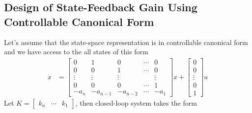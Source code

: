 \documentclass[twoside]{article}
\begin{document}
\subsection{Design of State-Feedback Gain Using Controllable Canonical
Form}

Let's assume that the state-space representation is in controllable
canonical form and we have access to the all states of this form
%
\begin{align*}
\dot{x} &= \left[ \begin{array}{ccccc} 0 & 1 & 0 & \cdots & 0 \\ 0 & 0 & 1 &
                                                                      \cdots & 0
\\ \vdots & \vdots & \vdots & & \vdots
\\ 0 & 0 & 0 & \cdots & 1
    \\ -a_n & -a_{n-1} & -a_{n-2} & \cdots & -a_1 \end{array} \right] x +
\left[ \begin{array}{c} 0\\ 0 \\ \vdots \\ 0
    \\ 1 \end{array} \right] u
\end{align*}
%
Let $K = \left[ \begin{array}{ccc} k_n & \cdots & k_1 \end{array} \right]$, then
closed-loop system takes the form
%
\end{document}
